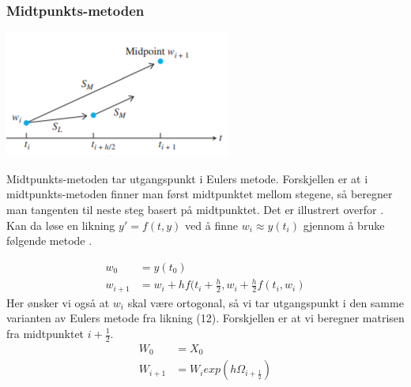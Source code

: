 \subsubsection{Midtpunkts-metoden}
\begin{center}
    \includegraphics{rapport/teori/bilder/midpoint.PNG}
\end{center}
Midtpunkts-metoden tar utgangspunkt i Eulers metode. Forskjellen er at i midtpunkts-metoden finner man først midtpunktet mellom stegene, så beregner man tangenten til neste steg basert på midtpunktet. Det er illustrert overfor \cite{MATEMATIKK:1}.\newline\newline
Kan da løse en likning $y' = f(t, y)$ ved å finne $w_i \approx y(t_i)$ gjennom å bruke følgende metode \cite{MATEMATIKK:1}.

\begin{equation}
\begin{aligned}
    w_0&=y(t_0)\\
    w_{i+1}&=w_i + hf(t_i+\frac{h}{2}, w_i+\frac{h}{2}f(t_i, w_i)
\end{aligned}
\end{equation}
Her ønsker vi også at $w_i$ skal være ortogonal, så vi tar utgangspunkt i den samme varianten av Eulers metode fra likning (12). Forskjellen er at vi beregner matrisen fra midtpunktet $i+\frac{1}{2}$.
\begin{equation}
\begin{aligned}
    W_0&=X_0\\
    W_{i+1}&=W_iexp(h\Omega_{i+\frac{1}{2}})
\end{aligned}
\end{equation}



